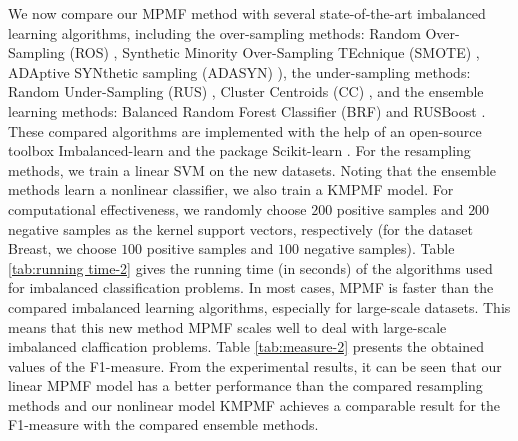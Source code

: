 \documentclass[15pt]{article}
\begin{document}
We now compare our MPMF method with several state-of-the-art imbalanced learning algorithms,
including the over-sampling methods: Random Over-Sampling (ROS) \cite{He2009}, 
Synthetic Minority Over-Sampling TEchnique (SMOTE) \cite{Chawla2002},
ADAptive SYNthetic sampling (ADASYN) \cite{He2008}), the under-sampling methods: 
Random Under-Sampling (RUS) \cite{He2009}, Cluster Centroids (CC) \cite{Lemaitre2017}, 
and the ensemble learning methods: Balanced Random Forest Classifier (BRF) \cite{Chen2004} 
and RUSBoost \cite{Seiffert2009}. 
These compared algorithms are implemented with the help of an open-source toolbox Imbalanced-learn \cite{Lemaitre2017}
and the package Scikit-learn \cite{Pedregosa2011}.
For the resampling methods, we train a linear SVM on the new datasets.
Noting that the ensemble methods learn a nonlinear classifier, we also train a KMPMF model.
For computational effectiveness, we randomly choose $200$ positive samples and $200$ negative samples 
as the kernel support vectors, respectively (for the dataset Breast, we choose $100$ positive samples 
and $100$ negative samples). Table \ref{tab:running time-2} gives the running time (in seconds) of 
the algorithms used for imbalanced classification problems.
In most cases, MPMF is faster than the compared imbalanced learning algorithms, especially for large-scale datasets.
This means that this new method MPMF scales well to deal with large-scale imbalanced claffication problems.
Table \ref{tab:measure-2} presents the obtained values of the F1-measure.
From the experimental results, it can be seen that our linear MPMF model has a better performance than 
the compared resampling methods and our nonlinear model KMPMF achieves a comparable result for the F1-measure 
with the compared ensemble methods.
\end{document}
